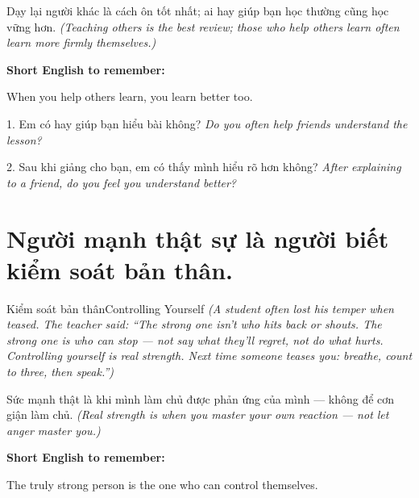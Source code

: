 \begin{baihoc}
Dạy lại người khác là cách ôn tốt nhất; ai hay giúp bạn học thường cũng học vững hơn.
\textit{(Teaching others is the best review; those who help others learn often learn more firmly themselves.)}
\end{baihoc}

\begin{ghinhoanh}
\textbf{Short English to remember:}

When you help others learn, you learn better too.

\end{ghinhoanh}

\begin{tuhocnhanh}
1. Em có hay giúp bạn hiểu bài không? \textit{Do you often help friends understand the lesson?}

2. Sau khi giảng cho bạn, em có thấy mình hiểu rõ hơn không? \textit{After explaining to a friend, do you feel you understand better?}
\end{tuhocnhanh}
\ngancach

\section{Người mạnh thật sự là người biết kiểm soát bản thân.}
\begin{truyen}{Kiểm soát bản thân}{Controlling Yourself}
\textit{(A student often lost his temper when teased. The teacher said: ``The strong one isn't who hits back or shouts. The strong one is who can stop — not say what they'll regret, not do what hurts. Controlling yourself is real strength. Next time someone teases you: breathe, count to three, then speak.'')}
\end{truyen}

\begin{baihoc}
Sức mạnh thật là khi mình làm chủ được phản ứng của mình — không để cơn giận làm chủ.
\textit{(Real strength is when you master your own reaction — not let anger master you.)}
\end{baihoc}

\begin{ghinhoanh}
\textbf{Short English to remember:}

The truly strong person is the one who can control themselves.

\end{ghinhoanh}


